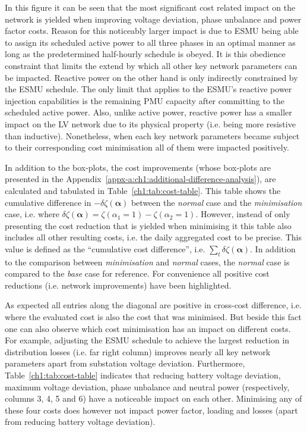 

In this figure it can be seen that the most significant cost related impact on the network is yielded when improving voltage deviation, phase unbalance and power factor costs.
Reason for this noticeably larger impact is due to ESMU being able to assign its scheduled active power to all three phases in an optimal manner as long as the predetermined half-hourly schedule is obeyed.
It is this obedience constraint that limits the extend by which all other key network parameters can be impacted.
Reactive power on the other hand is only indirectly constrained by the ESMU schedule.
The only limit that applies to the ESMU's reactive power injection capabilities is the remaining PMU capacity after committing to the scheduled active power.
Also, unlike active power, reactive power has a smaller impact on the LV network due to its physical property (i.e. being more resistive than inductive).
Nonetheless, when each key network parameters became subject to their corresponding cost minimisation all of them were impacted positively.

In addition to the box-plots, the cost improvements (whose box-plots are presented in the Appendix~\ref{appx-a:ch1:additional-difference-analysis}), are calculated and tabulated in Table~\ref{ch1:tab:cost-table}.
This table shows the cumulative difference in $-\delta\zeta(\boldsymbol{\alpha})$ between the \textit{normal} case and the \textit{minimisation} case, i.e. where $\delta\zeta(\boldsymbol{\alpha}) = \zeta(\alpha_1 = 1) - \zeta(\alpha_2 = 1)$.
However, instead of only presenting the cost reduction that is yielded when minimising it this table also includes all other resulting costs, i.e. the daily aggregated cost to be precise.
This value is defined as the ``cumulative cost difference'', i.e. $\sum_t \delta\zeta(\boldsymbol{\alpha})$.
In addition to the comparison between \textit{minimisation} and \textit{normal} cases, the \textit{normal} case is compared to the \textit{base} case for reference.
For convenience all positive cost reductions (i.e. network improvements) have been highlighted.



As expected all entries along the diagonal are positive in cross-cost difference, i.e. where the evaluated cost is also the cost that was minimised.
But beside this fact one can also observe which cost minimisation has an impact on different costs.
For example, adjusting the ESMU schedule to achieve the largest reduction in distribution losses (i.e. far right column) improves nearly all key network parameters apart from substation voltage deviation.
Furthermore, Table~\ref{ch1:tab:cost-table} indicates that reducing battery voltage deviation, maximum voltage deviation, phase unbalance and neutral power (respectively, columns 3, 4, 5 and 6) have a noticeable impact on each other.
Minimising any of these four costs does however not impact power factor, loading and losses (apart from reducing battery voltage deviation).

